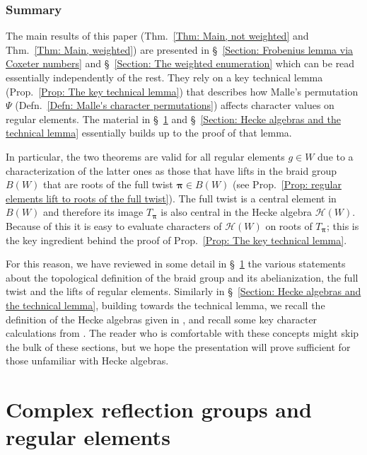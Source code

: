 \documentclass[ALCO, Unicode]{cedram}
\begin{document}
\subsubsection*{Summary}

The main results of this paper (Thm.~\ref{Thm: Main, not weighted} and Thm.~\ref{Thm: Main, weighted}) are presented in \S~\ref{Section: Frobenius lemma via Coxeter numbers} and \S~\ref{Section: The weighted enumeration} which can be read essentially independently of the rest. They rely on a key technical lemma (Prop.~\ref{Prop: The key technical lemma}) that describes how Malle's permutation $\Psi$ (Defn.~\ref{Defn: Malle's character permutations}) affects character values on regular elements. The material in \S~\ref{Section: Complex reflection groups and regular elements} and \S~\ref{Section: Hecke algebras and the technical lemma} essentially builds up to the proof of that lemma.

In particular, the two theorems are valid for all regular elements $g\in W$ due to a characterization of the latter ones as those that have lifts in the braid group $B(W)$ that are roots of the full twist $\bm\pi\in B(W)$ (see Prop.~\ref{Prop: regular elements lift to roots of the full twist}). The full twist is a central element in $B(W)$ and therefore its image $T_{\bm\pi}$ is also central in the Hecke algebra $\mathcal{H}(W)$. Because of this it is easy to evaluate characters of $\mathcal{H}(W)$ on roots of $T_{\bm\pi}$; this is the key ingredient behind the proof of Prop.~\ref{Prop: The key technical lemma}. 

For this reason, we have reviewed in some detail in \S~\ref{Section: Complex reflection groups and regular elements} the various statements about the topological definition of the braid group and its abelianization, the full twist and the lifts of regular elements. Similarly in \S~\ref{Section: Hecke algebras and the technical lemma}, building towards the technical lemma, we recall the definition of the Hecke algebras given in \cite{broue-malle-rouquier-braid-hecke}, and recall some key character calculations from \cite{broue-michel-french-paper}. The reader who is comfortable with these concepts might skip the bulk of these sections, but we hope the presentation will prove sufficient for those unfamiliar with Hecke algebras.

\section{Complex reflection groups and regular elements}
\label{Section: Complex reflection groups and regular elements}
\end{document}
